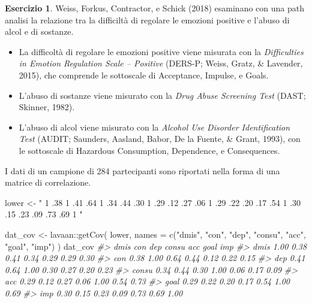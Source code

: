 \documentclass[
  11pt,
]{krantz}
\makeatletter
\newenvironment{Shaded}{\begin{snugshade}}{\end{snugshade}}
\newcommand{\AttributeTok}[1]{\textcolor[rgb]{0.61,0.61,0.61}{#1}}
\newcommand{\CommentTok}[1]{\textcolor[rgb]{0.37,0.37,0.37}{\textit{#1}}}
\newcommand{\FunctionTok}[1]{\textcolor[rgb]{0,0,0}{#1}}
\newcommand{\NormalTok}[1]{#1}
\newcommand{\OtherTok}[1]{\textcolor[rgb]{0.37,0.37,0.37}{#1}}
\newcommand{\SpecialCharTok}[1]{\textcolor[rgb]{0,0,0}{#1}}
\newcommand{\StringTok}[1]{\textcolor[rgb]{0.5,0.5,0.5}{#1}}
\providecommand{\tightlist}{%
  \setlength{\itemsep}{0pt}\setlength{\parskip}{0pt}}
\newenvironment{kframe}{%
\medskip{}
\setlength{\fboxsep}{.8em}
 \def\at@end@of@kframe{}%
 \ifinner\ifhmode%
  \def\at@end@of@kframe{\end{minipage}}%
  \begin{minipage}{\columnwidth}%
 \fi\fi%
 \def\FrameCommand##1{\hskip\@totalleftmargin \hskip-\fboxsep
 \colorbox{shadecolor}{##1}\hskip-\fboxsep
     \hskip-\linewidth \hskip-\@totalleftmargin \hskip\columnwidth}%
 \MakeFramed {\advance\hsize-\width
   \@totalleftmargin\z@ \linewidth\hsize
   \@setminipage}}%
 {\par\unskip\endMakeFramed%
 \at@end@of@kframe}
\renewenvironment{Shaded}{\begin{kframe}}{\end{kframe}}
\theoremstyle{definition}
\theoremstyle{definition}
\theoremstyle{definition}
\newtheorem{exercise}{Esercizio}[chapter]
\theoremstyle{definition}
\theoremstyle{remark}
\makeatother
\begin{document}
\begin{exercise}
Weiss, Forkus, Contractor, e Schick (2018) esaminano con una path analisi la relazione tra la difficiltà di regolare le emozioni positive e l'abuso di alcol e di sostanze.

\begin{itemize}
\tightlist
\item
  La difficoltà di regolare le emozioni positive viene misurata con la \emph{Difficulties in Emotion Regulation Scale -- Positive} (DERS-P; Weiss, Gratz, \& Lavender, 2015), che comprende le sottoscale di Acceptance, Impulse, e Goals.
\item
  L'abuso di sostanze viene misurato con la \emph{Drug Abuse Screening Test} (DAST; Skinner, 1982).
\item
  L'abuso di alcol viene misurato con la \emph{Alcohol Use Disorder Identification Test} (AUDIT; Saunders, Aasland, Babor, De la Fuente, \& Grant, 1993), con le sottoscale di Hazardous Consumption, Dependence, e Consequences.
\end{itemize}

I dati di un campione di 284 partecipanti sono riportati nella forma di una matrice di correlazione.

\begin{Shaded}
\begin{Highlighting}[]
\NormalTok{lower }\OtherTok{\textless{}{-}} \StringTok{"}
\StringTok{   1}
\StringTok{   .38 1}
\StringTok{   .41 .64 1}
\StringTok{   .34 .44 .30 1}
\StringTok{   .29 .12 .27 .06 1}
\StringTok{   .29 .22 .20 .17 .54 1}
\StringTok{   .30 .15 .23 .09 .73 .69 1}
\StringTok{"}
\end{Highlighting}
\end{Shaded}

\begin{Shaded}
\begin{Highlighting}[]
\NormalTok{dat\_cov }\OtherTok{\textless{}{-}}\NormalTok{ lavaan}\SpecialCharTok{::}\FunctionTok{getCov}\NormalTok{(}
\NormalTok{  lower,}
  \AttributeTok{names =} \FunctionTok{c}\NormalTok{(}\StringTok{"dmis"}\NormalTok{, }\StringTok{"con"}\NormalTok{, }\StringTok{"dep"}\NormalTok{, }\StringTok{"consu"}\NormalTok{, }\StringTok{"acc"}\NormalTok{, }\StringTok{"goal"}\NormalTok{, }\StringTok{"imp"}\NormalTok{)}
\NormalTok{)}
\NormalTok{dat\_cov}
\CommentTok{\#\textgreater{}       dmis  con  dep consu  acc goal  imp}
\CommentTok{\#\textgreater{} dmis  1.00 0.38 0.41  0.34 0.29 0.29 0.30}
\CommentTok{\#\textgreater{} con   0.38 1.00 0.64  0.44 0.12 0.22 0.15}
\CommentTok{\#\textgreater{} dep   0.41 0.64 1.00  0.30 0.27 0.20 0.23}
\CommentTok{\#\textgreater{} consu 0.34 0.44 0.30  1.00 0.06 0.17 0.09}
\CommentTok{\#\textgreater{} acc   0.29 0.12 0.27  0.06 1.00 0.54 0.73}
\CommentTok{\#\textgreater{} goal  0.29 0.22 0.20  0.17 0.54 1.00 0.69}
\CommentTok{\#\textgreater{} imp   0.30 0.15 0.23  0.09 0.73 0.69 1.00}
\end{Highlighting}
\end{Shaded}


\end{exercise}
\end{document}
